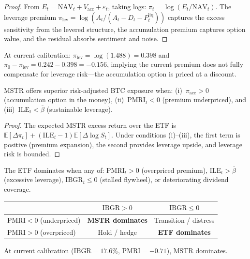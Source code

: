 \begin{proof}
  From $E_t = \mathrm{NAV}_t + V_{\mathrm{acc}} + \varepsilon_t$,
  taking logs: $\pi_t = \log(E_t/\mathrm{NAV}_t)$.  The leverage premium
  $\pi_{\mathrm{lev}} = \log(A_t/(A_t - D_t - P_t^{\mathrm{liq}}))$
  captures the excess sensitivity from the levered structure, the
  accumulation premium captures option value, and the residual absorbs
  sentiment and noise.
\end{proof}

At current calibration: $\pi_{\mathrm{lev}} = \log(1.488) = 0.398$ and
$\pi_0 - \pi_{\mathrm{lev}} = 0.242 - 0.398 = -0.156$, implying the
current premium does not fully compensate for leverage risk---the
accumulation option is priced at a discount.

\begin{proposition}\label{prop:mstr_dominates}
  MSTR offers superior risk-adjusted BTC exposure when:
  (i)~$\pi_{\mathrm{acc}} > 0$ (accumulation option in the money),
  (ii)~$\mathrm{PMRI}_t < 0$ (premium underpriced), and
  (iii)~$\mathrm{ILE}_t < \bar\beta$ (sustainable leverage).
\end{proposition}

\begin{proof}
  The expected MSTR excess return over the ETF is
  $\mathbb{E}[\Delta\pi_t] + (\mathrm{ILE}_t - 1)\mathbb{E}[\Delta\log S_t]$.
  Under conditions (i)--(iii), the first term is positive (premium expansion),
  the second provides leverage upside, and leverage risk is bounded.
\end{proof}

\begin{proposition}\label{prop:etf_dominates}
  The ETF dominates when any of: $\mathrm{PMRI}_t > 0$ (overpriced premium),
  $\mathrm{ILE}_t > \bar\beta$ (excessive leverage),
  $\mathrm{IBGR}_t \le 0$ (stalled flywheel), or deteriorating dividend
  coverage.
\end{proposition}

\begin{corollary}\label{cor:regime_map}
  \begin{center}
  \begin{tabular}{@{}lcc@{}}
  \toprule
  & $\mathrm{IBGR} > 0$ & $\mathrm{IBGR} \le 0$ \\
  \midrule
  $\mathrm{PMRI} < 0$ (underpriced)
    & \textbf{MSTR dominates} & Transition / distress \\
  $\mathrm{PMRI} > 0$ (overpriced)
    & Hold / hedge & \textbf{ETF dominates} \\
  \bottomrule
  \end{tabular}
  \end{center}
  At current calibration ($\mathrm{IBGR} = 17.6\%$,
  $\mathrm{PMRI} = -0.71$), MSTR dominates.
\end{corollary}

